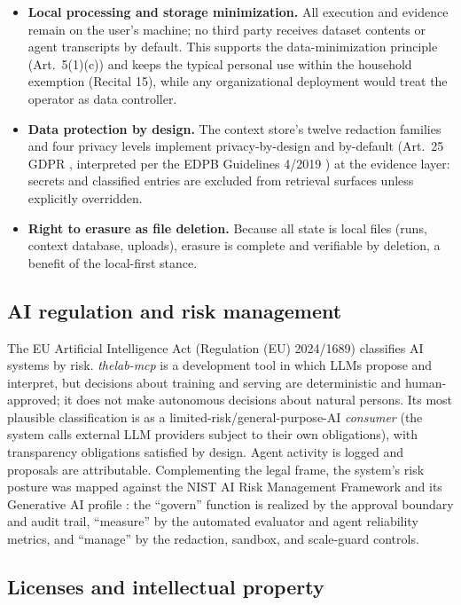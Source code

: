 \begin{itemize}
	\item \textbf{Local processing and storage minimization.} All execution and evidence remain on the user's machine; no third party receives dataset contents or agent transcripts by default. This supports the data-minimization principle (Art.\ 5(1)(c)) and keeps the typical personal use within the household exemption (Recital 15), while any organizational deployment would treat the operator as data controller.
	\item \textbf{Data protection by design.} The context store's twelve redaction families and four privacy levels implement privacy-by-design and by-default (Art.\ 25 GDPR \cite{gdpr2016}, interpreted per the EDPB Guidelines 4/2019 \cite{edpb2020art25}) at the evidence layer: secrets and classified entries are excluded from retrieval surfaces unless explicitly overridden.
	\item \textbf{Right to erasure as file deletion.} Because all state is local files (runs, context database, uploads), erasure is complete and verifiable by deletion, a benefit of the local-first stance.
\end{itemize}

\subsection{AI regulation and risk management}

The EU Artificial Intelligence Act (Regulation (EU) 2024/1689) \cite{euaiact2024} classifies AI systems by risk. \emph{thelab-mcp} is a development tool in which LLMs propose and interpret, but decisions about training and serving are deterministic and human-approved; it does not make autonomous decisions about natural persons. Its most plausible classification is as a limited-risk/general-purpose-AI \emph{consumer} (the system calls external LLM providers subject to their own obligations), with transparency obligations satisfied by design. Agent activity is logged and proposals are attributable. Complementing the legal frame, the system's risk posture was mapped against the NIST AI Risk Management Framework and its Generative AI profile \cite{nist2023airmf,nist2024genai}: the ``govern'' function is realized by the approval boundary and audit trail, ``measure'' by the automated evaluator and agent reliability metrics, and ``manage'' by the redaction, sandbox, and scale-guard controls.

\subsection{Licenses and intellectual property}

